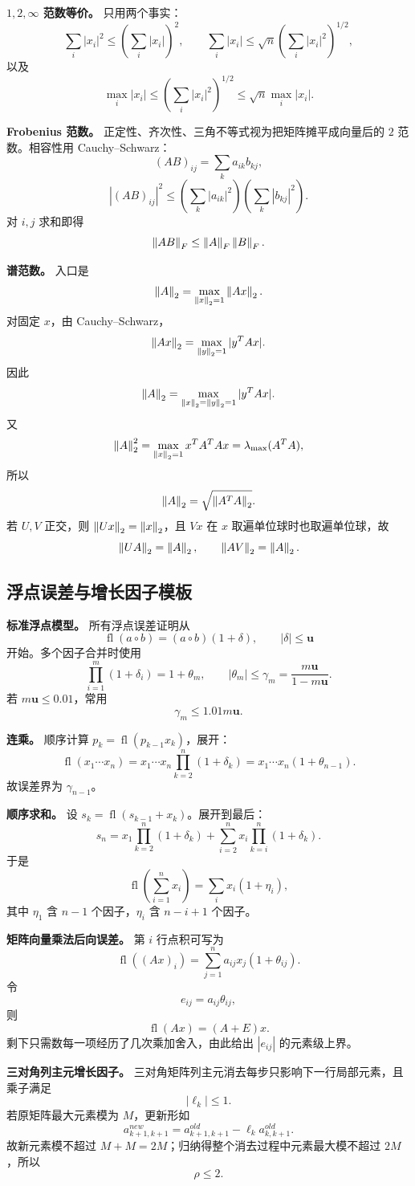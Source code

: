 \documentclass{article}
\newcommand{\fl}{\operatorname{fl}}
\begin{document}
\textbf{$1,2,\infty$ 范数等价。} 只用两个事实：
\[
  \sum_i |x_i|^2\le \left(\sum_i |x_i|\right)^2,\qquad
  \sum_i |x_i|\le \sqrt n\left(\sum_i |x_i|^2\right)^{1/2},
\]
以及
\[
  \max_i|x_i|\le\left(\sum_i |x_i|^2\right)^{1/2}
  \le \sqrt n\max_i|x_i|.
\]

\textbf{Frobenius 范数。} 正定性、齐次性、三角不等式视为把矩阵摊平成向量后的 $2$ 范数。相容性用 Cauchy--Schwarz：
\[
  (AB)_{ij}=\sum_k a_{ik}b_{kj},
\]
\[
  |(AB)_{ij}|^2
  \le \left(\sum_k |a_{ik}|^2\right)
      \left(\sum_k |b_{kj}|^2\right).
\]
对 $i,j$ 求和即得
\[
  \left\| AB \right\|_F\le\left\| A \right\|_F\left\| B \right\|_F.
\]

\textbf{谱范数。} 入口是
\[
  \left\| A \right\|_2=\max_{\left\| x \right\|_2=1}\left\| Ax \right\|_2.
\]
对固定 $x$，由 Cauchy--Schwarz，
\[
  \left\| Ax \right\|_2=\max_{\left\| y \right\|_2=1}|y^TAx|.
\]
因此
\[
  \left\| A \right\|_2=\max_{\left\| x \right\|_2=\left\| y \right\|_2=1}|y^TAx|.
\]
又
\[
  \left\| A \right\|_2^2=\max_{\left\| x \right\|_2=1}x^TA^TAx=\lambda_{\max}(A^TA),
\]
所以
\[
  \left\| A \right\|_2=\sqrt{\left\| A^TA \right\|_2}.
\]
若 $U,V$ 正交，则 $\left\| Ux \right\|_2=\left\| x \right\|_2$，且 $Vx$ 在 $x$ 取遍单位球时也取遍单位球，故
\[
  \left\| UA \right\|_2=\left\| A \right\|_2,\qquad \left\| AV \right\|_2=\left\| A \right\|_2.
\]

\subsection{浮点误差与增长因子模板}

\textbf{标准浮点模型。} 所有浮点误差证明从
\[
  \fl(a\circ b)=(a\circ b)(1+\delta),\qquad |\delta|\le\mathbf u
\]
开始。多个因子合并时使用
\[
  \prod_{i=1}^m(1+\delta_i)=1+\theta_m,\qquad
  |\theta_m|\le\gamma_m=\frac{m\mathbf u}{1-m\mathbf u}.
\]
若 $m\mathbf u\le0.01$，常用
\[
  \gamma_m\le1.01m\mathbf u.
\]

\textbf{连乘。} 顺序计算 $p_k=\fl(p_{k-1}x_k)$，展开：
\[
  \fl(x_1\cdots x_n)=x_1\cdots x_n\prod_{k=2}^n(1+\delta_k)
  =x_1\cdots x_n(1+\theta_{n-1}).
\]
故误差界为 $\gamma_{n-1}$。

\textbf{顺序求和。} 设 $s_k=\fl(s_{k-1}+x_k)$。展开到最后：
\[
  s_n=x_1\prod_{k=2}^n(1+\delta_k)
  +\sum_{i=2}^n x_i\prod_{k=i}^n(1+\delta_k).
\]
于是
\[
  \fl\left(\sum_{i=1}^n x_i\right)=\sum_i x_i(1+\eta_i),
\]
其中 $\eta_1$ 含 $n-1$ 个因子，$\eta_i$ 含 $n-i+1$ 个因子。

\textbf{矩阵向量乘法后向误差。} 第 $i$ 行点积可写为
\[
  \fl((Ax)_i)=\sum_{j=1}^n a_{ij}x_j(1+\theta_{ij}).
\]
令
\[
  e_{ij}=a_{ij}\theta_{ij},
\]
则
\[
  \fl(Ax)=(A+E)x.
\]
剩下只需数每一项经历了几次乘加舍入，由此给出 $|e_{ij}|$ 的元素级上界。

\textbf{三对角列主元增长因子。} 三对角矩阵列主元消去每步只影响下一行局部元素，且乘子满足
\[
  |\ell_k|\le1.
\]
若原矩阵最大元素模为 $M$，更新形如
\[
  a_{k+1,k+1}^{new}=a_{k+1,k+1}^{old}-\ell_k a_{k,k+1}^{old}.
\]
故新元素模不超过 $M+M=2M$；归纳得整个消去过程中元素最大模不超过 $2M$，所以
\[
  \rho\le2.
\]
\end{document}
